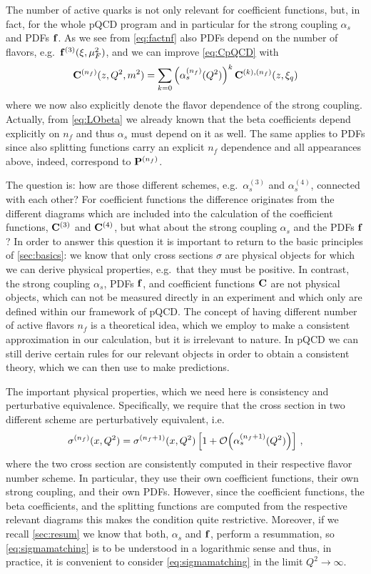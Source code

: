 The number of active quarks is not only relevant for coefficient functions, but, in fact, for the whole pQCD program and in particular for the strong coupling $\alpha_s$ and PDFs $\vb f$.
As we see from \cref{eq:factnf} also PDFs depend on the number of flavors, e.g.\ $\vb f^{(3)}(\xi,\mu_F^2)$, and we can improve \cref{eq:CpQCD} with
\begin{equation}
    \vb C^{(n_f)}(z,Q^2,m^2) = \sum_{k=0} \left(\alpha_s^{(n_f)}(Q^2)\right)^k \vb C^{(k),(n_f)}(z,\xi_q)
\end{equation}
where we now also explicitly denote the flavor dependence of the strong coupling.
Actually, from \cref{eq:LObeta} we already known that the beta coefficients depend explicitly on $n_f$ and thus $\alpha_s$ must depend on it as well.
The same applies to PDFs since also splitting functions carry an explicit $n_f$ dependence and all appearances above, indeed, correspond to $\vb P^{(n_f)}$.

The question is: how are those different schemes, e.g.\ $\alpha_s^{(3)}$ and $\alpha_s^{(4)}$, connected with each other?
For coefficient functions the difference originates from the different diagrams which are included into the calculation of the coefficient functions, $\vb C^{(3)}$ and $\vb C^{(4)}$, but what about the strong coupling $\alpha_s$ and the PDFs $\vb f$?
In order to answer this question it is important to return to the basic principles of \cref{sec:basics}: we know that only cross sections $\sigma$ are physical objects for which we can derive physical properties, e.g.\ that they must be positive.
In contrast, the strong coupling $\alpha_s$, PDFs $\vb f$, and coefficient functions $\vb C$ are not physical objects, which can not be measured directly in an experiment and which only are defined within our framework of pQCD.
The concept of having different number of active flavors $n_f$ is a theoretical idea, which we employ to make a consistent approximation in our calculation, but it is irrelevant to nature.
In pQCD we can still derive certain rules for our relevant objects in order to obtain a consistent theory, which we can then use to make predictions.

The important physical properties, which we need here is consistency and perturbative equivalence.
Specifically, we require that the cross section in two different scheme are perturbatively equivalent, i.e.\
\begin{equation}
    \sigma^{(n_f)}(x,Q^2) = \sigma^{(n_f+1)}(x,Q^2)\left[1 + \order{\alpha_s^{(n_f+1)}(Q^2)}\right]\,, \label{eq:sigmamatching}
\end{equation}
where the two cross section are consistently computed in their respective flavor number scheme.
In particular, they use their own coefficient functions, their own strong coupling, and their own PDFs.
However, since the coefficient functions, the beta coefficients, and the splitting functions are computed from the respective relevant diagrams this makes the condition quite restrictive.
Moreover, if we recall \cref{sec:resum} we know that both, $\alpha_s$ and $\vb f$, perform a resummation, so \cref{eq:sigmamatching} is to be understood in a logarithmic sense and thus, in practice, it is convenient to consider \cref{eq:sigmamatching} in the limit $Q^2 \to \infty$.

